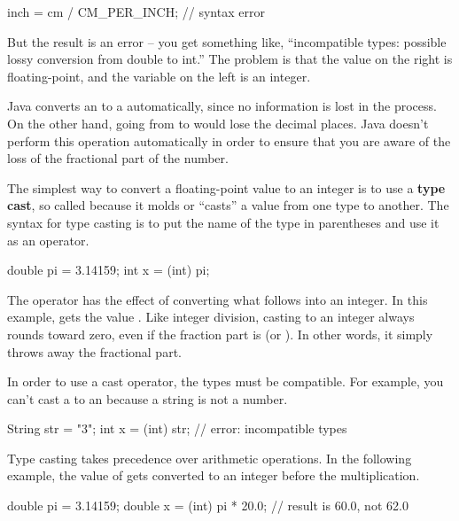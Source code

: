 \begin{code}
inch = cm / CM_PER_INCH;  // syntax error
\end{code}

But the result is an error -- you get something like, ``incompatible types: possible lossy conversion from double to int.''
The problem is that the value on the right is floating-point, and the variable on the left is an integer.

Java converts an  to a  automatically, since no information is lost in the process.
On the other hand, going from  to  would lose the decimal places.
Java doesn't perform this operation automatically in order to ensure that you are aware of the loss of the fractional part of the number.


The simplest way to convert a floating-point value to an integer is to use a {\bf type cast}, so called because it molds or ``casts'' a value from one type to another.
The syntax for type casting is to put the name of the type in parentheses and use it as an operator.

\begin{code}
double pi = 3.14159;
int x = (int) pi;
\end{code}

The  operator has the effect of converting what follows into an integer.
In this example,  gets the value .
Like integer division, casting to an integer always rounds toward zero, even if the fraction part is  (or ).
In other words, it simply throws away the fractional part.

In order to use a cast operator, the types must be compatible.
For example, you can't cast a  to an  because a string is not a number.

\begin{code}
String str = "3";
int x = (int) str;  // error: incompatible types
\end{code}

Type casting takes precedence over arithmetic operations.
In the following example, the value of  gets converted to an integer before the multiplication.

\begin{code}
double pi = 3.14159;
double x = (int) pi * 20.0;  // result is 60.0, not 62.0
\end{code}

